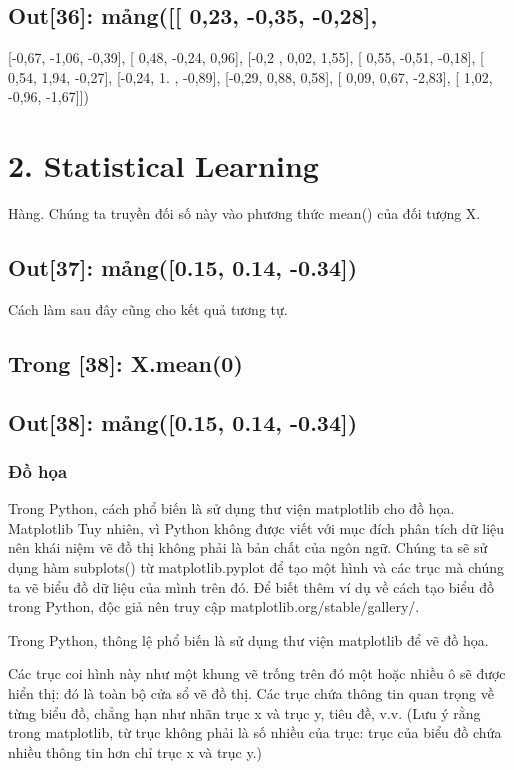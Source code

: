 \subsection{Out[36]: mảng([[ 0,23, -0,35, -0,28],}

[-0,67, -1,06, -0,39], [ 0,48, -0,24, 0,96], [-0,2 , 0,02, 1,55], [ 0,55, -0,51, -0,18], [ 0,54, 1,94, -0,27], [-0,24, 1. , -0,89], [-0,29, 0,88, 0,58], [ 0,09, 0,67, -2,83], [ 1,02, -0,96, -1,67]])

\section{2. Statistical Learning}

Hàng. Chúng ta truyền đối số này vào phương thức mean() của đối tượng X.

\subsection{Out[37]: mảng([0.15, 0.14, -0.34])}

Cách làm sau đây cũng cho kết quả tương tự.

\subsection{Trong [38]: X.mean(0)}

\subsection{Out[38]: mảng([0.15, 0.14, -0.34])}

\subsubsection{Đồ họa}

Trong Python, cách phổ biến là sử dụng thư viện matplotlib cho đồ họa. Matplotlib Tuy nhiên, vì Python không được viết với mục đích phân tích dữ liệu nên khái niệm vẽ đồ thị không phải là bản chất của ngôn ngữ. Chúng ta sẽ sử dụng hàm subplots() từ matplotlib.pyplot để tạo một hình và các trục mà chúng ta vẽ biểu đồ dữ liệu của mình trên đó. Để biết thêm ví dụ về cách tạo biểu đồ trong Python, độc giả nên truy cập matplotlib.org/stable/gallery/.

Trong Python, thông lệ phổ biến là sử dụng thư viện matplotlib để vẽ đồ họa.

Các trục coi hình này như một khung vẽ trống trên đó một hoặc nhiều ô sẽ được hiển thị: đó là toàn bộ cửa sổ vẽ đồ thị. Các trục chứa thông tin quan trọng về từng biểu đồ, chẳng hạn như nhãn trục x và trục y, tiêu đề, v.v. (Lưu ý rằng trong matplotlib, từ trục không phải là số nhiều của trục: trục của biểu đồ chứa nhiều thông tin hơn chỉ trục x và trục y.)

